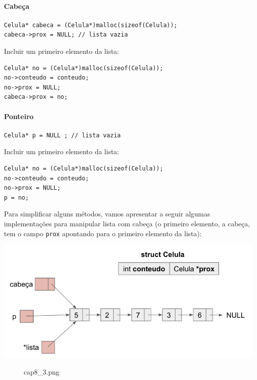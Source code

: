 \documentclass[12pt,a4paper]{article}
\begin{document}
    \hypertarget{cabeuxe7a}{%
\paragraph{Cabeça}\label{cabeuxe7a}}

\begin{verbatim}
Celula* cabeca = (Celula*)malloc(sizeof(Celula));
cabeca->prox = NULL; // lista vazia
\end{verbatim}

Incluir um primeiro elemento da lista:

\begin{verbatim}
Celula* no = (Celula*)malloc(sizeof(Celula));
no->conteudo = conteudo;
no->prox = NULL;
cabeca->prox = no;
\end{verbatim}

    \hypertarget{ponteiro}{%
\paragraph{Ponteiro}\label{ponteiro}}

\begin{verbatim}
Celula* p = NULL ; // lista vazia
\end{verbatim}

Incluir um primeiro elemento da lista:

\begin{verbatim}
Celula* no = (Celula*)malloc(sizeof(Celula));
no->conteudo = conteudo;
no->prox = NULL;
p = no;
\end{verbatim}

Para simplificar alguns métodos, vamos apresentar a seguir algumas
implementações para manipular lista com cabeça (o primeiro elemento, a
cabeça, tem o campo \texttt{prox} apontando para o primeiro elemento da
lista):

\includegraphics{"figs/cap8_3.png"}

    \begin{figure}
\centering
\caption{cap8\_3.png}
\end{figure}
\end{document}
